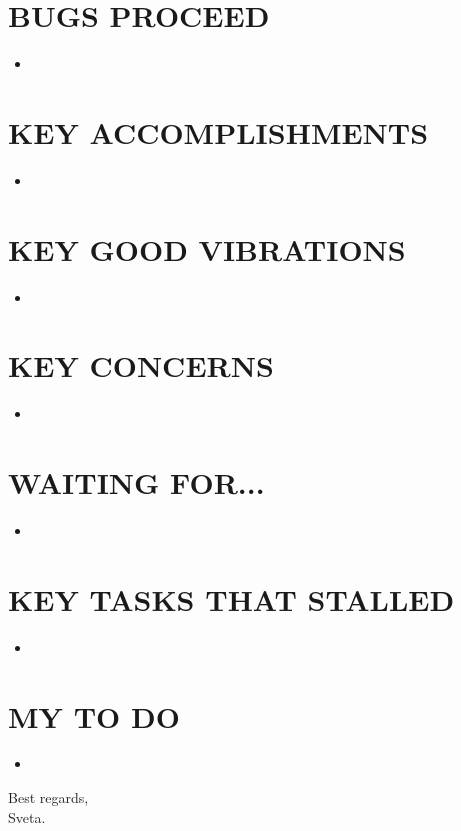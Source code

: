 \documentclass[a4]{article}
\begin{document}
	\section*{BUGS PROCEED}
	\begin{itemize}
		\item
	\end{itemize}
	
	\section*{KEY ACCOMPLISHMENTS}
	\begin{itemize}
		\item 
	\end{itemize}
	
	\section*{KEY GOOD VIBRATIONS}
	\begin{itemize}
		\item 
	\end{itemize}
	
	\section*{KEY CONCERNS}
	\begin{itemize}
		\item 
	\end{itemize}
	
	\section*{WAITING FOR...}
	\begin{itemize}
		\item 
	\end{itemize}
	
	\section*{KEY TASKS THAT STALLED}
	\begin{itemize}
		\item
	\end{itemize}
	
	\section*{MY TO DO}
	\begin{itemize}
		\item 
	\end{itemize}
	
	\par\noindent
	Best regards,\\
	Sveta.
	
\end{document}
